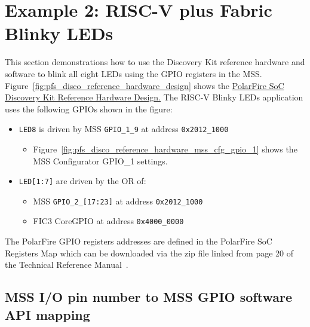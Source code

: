 \section{Example 2: RISC-V plus Fabric Blinky LEDs}
\label{sec:riscv_blinky}

This section demonstrations how to use the Discovery Kit reference hardware
and software to blink all eight LEDs using the GPIO registers in the MSS.
%
Figure~\ref{fig:pfs_disco_reference_hardware_design} shows the
\href{https://github.com/polarfire-soc/polarfire-soc-discovery-kit-reference-design}
{PolarFire SoC Discovery Kit Reference Hardware Design.}
%
The RISC-V Blinky LEDs application uses the following GPIOs shown in the figure:
%
\begin{itemize}
\item \texttt{LED8} is driven by MSS \texttt{GPIO\_1\_9} at address \texttt{0x2012\_1000}
\begin{itemize}
\item
Figure~\ref{fig:pfs_disco_reference_hardware_mss_cfg_gpio_1} shows the MSS Configurator
GPIO\_1 settings.
\end{itemize}
%
\item \texttt{LED[1:7]} are driven by the OR of:
\begin{itemize}
\item MSS \texttt{GPIO\_2\_[17:23]} at address \texttt{0x2012\_1000}
\item FIC3 CoreGPIO at address \texttt{0x4000\_0000}
\end{itemize}
\end{itemize}
%
The PolarFire GPIO registers addresses are defined in the PolarFire SoC
Registers Map which can be downloaded via the zip file linked from
page 20 of the Technical Reference Manual~\cite{Microchip_PFSoC_TRM_2025}.

\subsection{MSS I/O pin number to MSS GPIO software API mapping}

